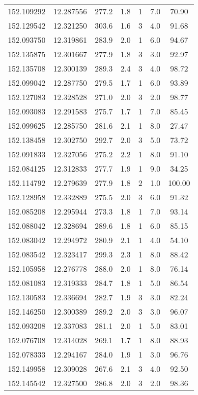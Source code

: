 \documentclass[%
 aip,
 jmp,%
 amsmath,amssymb,
 reprint,%
]{aastex61}
\begin{document}
\begin{center}
\begin{longtable}{lcccccc}
152.109292 & 12.287556 & 277.2 & 1.8 & 1 & 7.0 & 70.90 \\
152.129542 & 12.321250 & 303.6 & 1.6 & 3 & 4.0 & 91.68 \\
152.093750 & 12.319861 & 283.9 & 2.0 & 1 & 6.0 & 94.67 \\
152.135875 & 12.301667 & 277.9 & 1.8 & 3 & 3.0 & 92.97 \\
152.135708 & 12.300139 & 289.3 & 2.4 & 3 & 4.0 & 98.72 \\
152.099042 & 12.287750 & 279.5 & 1.7 & 1 & 6.0 & 93.89 \\
152.127083 & 12.328528 & 271.0 & 2.0 & 3 & 2.0 & 98.77 \\
152.093083 & 12.291583 & 275.7 & 1.7 & 1 & 7.0 & 85.45 \\
152.099625 & 12.285750 & 281.6 & 2.1 & 1 & 8.0 & 27.47 \\
152.138458 & 12.302750 & 292.7 & 2.0 & 3 & 5.0 & 73.72 \\
152.091833 & 12.327056 & 275.2 & 2.2 & 1 & 8.0 & 91.10 \\
152.084125 & 12.312833 & 277.7 & 1.9 & 1 & 9.0 & 34.25 \\
152.114792 & 12.279639 & 277.9 & 1.8 & 2 & 1.0 & 100.00 \\
152.128958 & 12.332889 & 275.5 & 2.0 & 3 & 6.0 & 91.32 \\
152.085208 & 12.295944 & 273.3 & 1.8 & 1 & 7.0 & 93.14 \\
152.088042 & 12.328694 & 289.6 & 1.8 & 1 & 6.0 & 85.15 \\
152.083042 & 12.294972 & 280.9 & 2.1 & 1 & 4.0 & 54.10 \\
152.083542 & 12.323417 & 299.3 & 2.3 & 1 & 8.0 & 88.42 \\
152.105958 & 12.276778 & 288.0 & 2.0 & 1 & 8.0 & 76.14 \\
152.081083 & 12.319333 & 284.7 & 1.8 & 1 & 5.0 & 86.54 \\
152.130583 & 12.336694 & 282.7 & 1.9 & 3 & 3.0 & 82.24 \\
152.146250 & 12.300389 & 289.2 & 2.0 & 3 & 3.0 & 96.07 \\
152.093208 & 12.337083 & 281.1 & 2.0 & 1 & 5.0 & 83.01 \\
152.076708 & 12.314028 & 269.1 & 1.7 & 1 & 8.0 & 88.93 \\
152.078333 & 12.294167 & 284.0 & 1.9 & 1 & 3.0 & 96.76 \\
152.149958 & 12.309028 & 267.6 & 2.1 & 3 & 4.0 & 92.50 \\
152.145542 & 12.327500 & 286.8 & 2.0 & 3 & 2.0 & 98.36 \\

\end{longtable}
\end{center}
\end{document}
